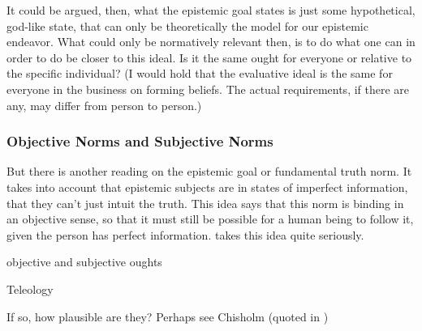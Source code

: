 \documentclass[12pt,numbers=noenddot]{scrartcl}
\begin{document}
It could be argued, then, what the epistemic goal states is just some hypothetical, god-like state, that can only be theoretically the model for our epistemic endeavor. What could only be normatively relevant then, is to do what one can in order to do be closer to this ideal. Is it the same ought for everyone or relative to the specific individual? (I would hold that the evaluative ideal is the same for everyone in the business on forming beliefs. The actual requirements, if there are any, may differ from person to person.)

\subsubsection{Objective Norms and Subjective Norms}

But there is another reading on the epistemic goal or fundamental truth norm. It takes into account that epistemic subjects are in states of imperfect information, that they can't just intuit the truth. This idea says that this norm is binding in an objective sense, so that it must still be possible for a human being to follow it, given the person has perfect information. \textcite{Gibbard2005-GIBTAC} takes this idea quite seriously.

objective and subjective oughts
\textcite{Gibbard2005-GIBTAC} 
\textcite{Wedgwood2016-WEDOAS}
\textcite[Ch. 2]{Gibbons2013-GIBTNO}

Teleology
\textcite[Ch. 5]{Gibbons2013-GIBTNO}

If so, how plausible are they? Perhaps see Chisholm (quoted in \textcite{Goldman2002-GOLTUO-2})


\end{document}
